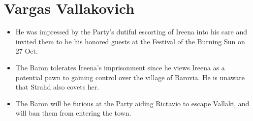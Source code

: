\documentclass[a4paper,11pt]{article}
\begin{document}
\section{Vargas Vallakovich}
\begin{itemize}
  \item He was impressed by the Party's dutiful escorting of Ireena into his care and invited them to be his
  honored guests at the Festival of the Burning Sun on 27 Oct.
  \item The Baron tolerates Ireena's imprisonment since he views Ireena as a potential pawn to gaining control over 
  the village of Barovia. He is unaware that Strahd also covets her.
  \item The Baron will be furious at the Party aiding Rictavio to escape Vallaki, and will ban them from entering
  the town.
\end{itemize}
\end{document}
